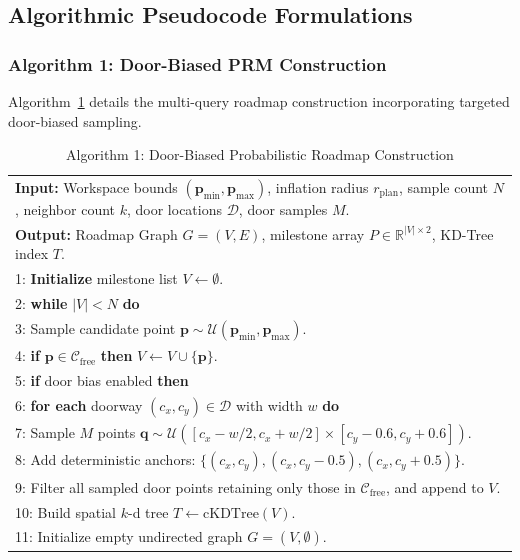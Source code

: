 \documentclass[12pt,a4paper]{article}
\begin{document}
\subsection{Algorithmic Pseudocode Formulations}

\subsubsection{Algorithm 1: Door-Biased PRM Construction}
Algorithm~\ref{alg:prm_build} details the multi-query roadmap construction incorporating targeted door-biased sampling.

\begin{table}[H]
\centering
\caption{Algorithm 1: Door-Biased Probabilistic Roadmap Construction}
\label{alg:prm_build}
\begin{tabular}{|p{\dimexpr\linewidth-2\tabcolsep-2\fboxrule\relax}|}
\hline
\textbf{Input:} Workspace bounds $(\mathbf{p}_{\min}, \mathbf{p}_{\max})$, inflation radius $r_{\text{plan}}$, sample count $N$, neighbor count $k$, door locations $\mathcal{D}$, door samples $M$. \\
\textbf{Output:} Roadmap Graph $G = (V, E)$, milestone array $P \in \mathbb{R}^{|V| \times 2}$, KD-Tree index $T$. \\ \hline
1: \textbf{Initialize} milestone list $V \leftarrow \emptyset$. \\
2: \textbf{while} $|V| < N$ \textbf{do} \\
3: \quad Sample candidate point $\mathbf{p} \sim \mathcal{U}(\mathbf{p}_{\min}, \mathbf{p}_{\max})$. \\
4: \quad \textbf{if} $\mathbf{p} \in \mathcal{C}_{\text{free}}$ \textbf{then} $V \leftarrow V \cup \{\mathbf{p}\}$. \\
5: \textbf{if} door bias enabled \textbf{then} \\
6: \quad \textbf{for each} doorway $(c_x, c_y) \in \mathcal{D}$ with width $w$ \textbf{do} \\
7: \qquad Sample $M$ points $\mathbf{q} \sim \mathcal{U}([c_x - w/2, c_x + w/2] \times [c_y - 0.6, c_y + 0.6])$. \\
8: \qquad Add deterministic anchors: $\{(c_x, c_y), (c_x, c_y - 0.5), (c_x, c_y + 0.5)\}$. \\
9: \qquad Filter all sampled door points retaining only those in $\mathcal{C}_{\text{free}}$, and append to $V$. \\
10: Build spatial $k$-d tree $T \leftarrow \text{cKDTree}(V)$. \\
11: Initialize empty undirected graph $G = (V, \emptyset)$. \\

\end{tabular}
\end{table}
\end{document}
